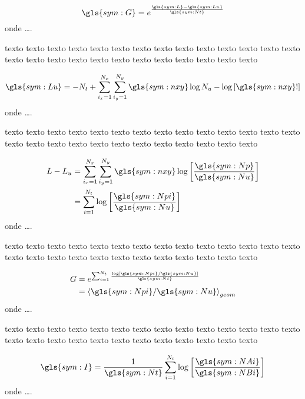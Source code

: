 \begin{equation}
	\ensuremath{
		\gls{sym:G} = e^{ \frac{\gls{sym:L} - \gls{sym:Lu}}{\gls{sym:Nt}}   }
	}
	\label{eq:gain}
\end{equation}
onde \ldots.


texto texto texto texto texto texto texto texto texto texto texto texto texto
texto texto texto texto texto texto texto texto texto texto texto texto texto


\begin{equation}
	\ensuremath{
		\gls{sym:Lu} = -N_t + 
		\sum_{i_x = 1}^{N_x}\sum_{i_y=1}^{N_y}
		\gls{sym:nxy}\log N_u - \log \left[ \gls{sym:nxy}! \right]
	}
	\label{eq:lu}
\end{equation}
onde \ldots.


texto texto texto texto texto texto texto texto texto texto texto texto texto
texto texto texto texto texto texto texto texto texto texto texto texto texto


\begin{equation}
	\ensuremath{
	\begin{align}
		L - L_u & = \sum_{i_x = 1}^{N_x}\sum_{i_y=1}^{N_y}
				  \gls{sym:nxy}\log \left[ \frac{\gls{sym:Np}}{\gls{sym:Nu}} \right] \\
				& = \sum_{i = 1}^{N_t}\log \left[\frac{\gls{sym:Npi}}{\gls{sym:Nu}} \right]
	\end{align}}
	\label{eq:llu}
\end{equation}
onde \ldots.


texto texto texto texto texto texto texto texto texto texto texto texto texto
texto texto texto texto texto texto texto texto texto texto texto texto texto


\begin{equation}
	\ensuremath{
	\begin{align}
		G & = e^{\sum_{i = 1}^{N_t}
					\frac{\log \left[  \gls{sym:Npi} / \gls{sym:Nu}  \right]}
						 {\gls{sym:Nt}}
			  } \\
		  & = {\langle  \gls{sym:Npi} / \gls{sym:Nu}  \rangle}_{geom}
	\end{align}}
	\label{eq:G}
\end{equation}
onde \ldots.


texto texto texto texto texto texto texto texto texto texto texto texto texto
texto texto texto texto texto texto texto texto texto texto texto texto texto

\begin{equation}
	\ensuremath{
		\gls{sym:I} = \frac{1}{\gls{sym:Nt}} 
					  \sum_{i = 1}^{N_t}\log\left[ \frac{\gls{sym:NAi}}
					  								  {\gls{sym:NBi}}  \right]
	}
	\label{eq:gain}
\end{equation}
onde \ldots.


